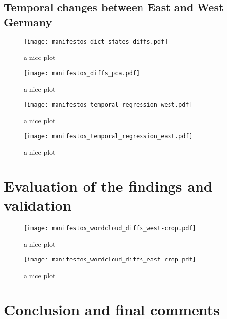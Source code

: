 \documentclass[a4paper]{scrreprt}
\begin{document}
\section{Temporal changes between East and West Germany}
\begin{figure}
    \centering
    \texttt{[image: manifestos\_dict\_states\_diffs.pdf]}
    \caption{a nice plot}
\end{figure}
\begin{figure}
    \centering
    \texttt{[image: manifestos\_diffs\_pca.pdf]}
    \caption{a nice plot}
\end{figure}
\begin{figure}
    \centering
    \texttt{[image: manifestos\_temporal\_regression\_west.pdf]}
    \caption{a nice plot}
\end{figure}
\begin{figure}
    \centering
    \texttt{[image: manifestos\_temporal\_regression\_east.pdf]}
    \caption{a nice plot}
\end{figure}
\chapter{Evaluation of the findings and validation}
\begin{figure}
    \centering
    \begin{minipage}{.5\textwidth}
        \centering
        \texttt{[image: manifestos\_wordcloud\_diffs\_west-crop.pdf]}
        \caption{a nice plot}
    \end{minipage}%
    \begin{minipage}{.5\textwidth}
        \centering
        \texttt{[image: manifestos\_wordcloud\_diffs\_east-crop.pdf]}
        \caption{a nice plot}
    \end{minipage}
\end{figure}
\chapter{Conclusion and final comments}


\end{document}
